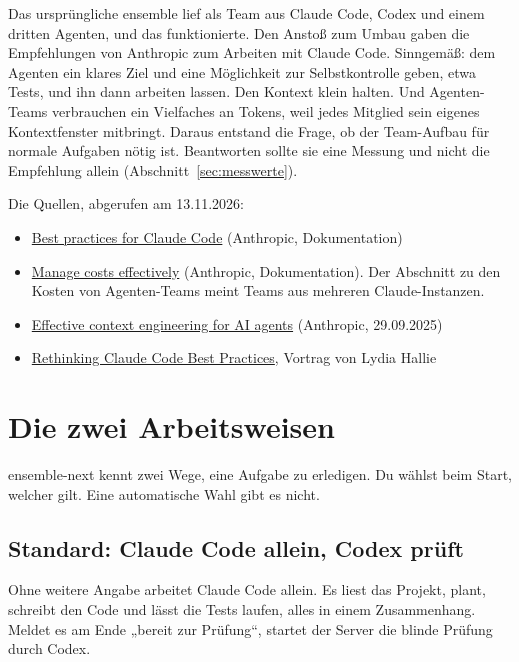 \documentclass[a4paper,10pt,parskip=half-,headings=small]{scrartcl}
\begin{document}
Das ursprüngliche ensemble lief als Team aus Claude Code, Codex und einem dritten Agenten, und das
funktionierte. Den Anstoß zum Umbau gaben die Empfehlungen von Anthropic zum Arbeiten mit Claude
Code. Sinngemäß: dem Agenten ein klares Ziel und eine Möglichkeit zur Selbstkontrolle geben, etwa
Tests, und ihn dann arbeiten lassen. Den Kontext klein halten. Und Agenten-Teams verbrauchen ein
Vielfaches an Tokens, weil jedes Mitglied sein eigenes Kontextfenster mitbringt. Daraus entstand die
Frage, ob der Team-Aufbau für normale Aufgaben nötig ist. Beantworten sollte sie eine Messung und
nicht die Empfehlung allein (Abschnitt~\ref{sec:messwerte}).

Die Quellen, abgerufen am 13.11.2026:

\begin{itemize}
\item \href{https://code.claude.com/docs/en/best-practices}{Best practices for Claude Code}
  (Anthropic, Dokumentation)
\item \href{https://code.claude.com/docs/en/costs}{Manage costs effectively} (Anthropic,
  Dokumentation). Der Abschnitt zu den Kosten von Agenten-Teams meint Teams aus mehreren
  Claude-Instanzen.
\item \href{https://www.anthropic.com/research/effective-context-engineering-for-ai-agents}{Effective
  context engineering for AI agents} (Anthropic, 29.09.2025)
\item \href{https://www.youtube.com/watch?v=vlfCjWuv4es}{Rethinking Claude Code Best Practices},
  Vortrag von Lydia Hallie
\end{itemize}

\section{Die zwei Arbeitsweisen}\label{sec:arbeitsweisen}

ensemble-next kennt zwei Wege, eine Aufgabe zu erledigen. Du wählst beim Start, welcher gilt. Eine
automatische Wahl gibt es nicht.

\subsection{Standard: Claude Code allein, Codex prüft}

Ohne weitere Angabe arbeitet Claude Code allein. Es liest das Projekt, plant, schreibt den Code und
lässt die Tests laufen, alles in einem Zusammenhang. Meldet es am Ende „bereit zur Prüfung“, startet
der Server die blinde Prüfung durch Codex.
\end{document}
